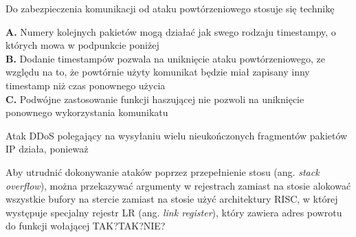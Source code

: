 \begin{solutions}
    \sol Do zabezpieczenia komunikacji od ataku powtórzeniowego stosuje się technikę

    \textbf{A.} Numery kolejnych pakietów mogą działać jak swego rodzaju timestampy, o których mowa w podpunkcie poniżej \\
    \textbf{B.} Dodanie timestampów pozwala na uniknięcie ataku powtórzeniowego, ze względu na to, że powtórnie użyty komunikat będzie miał zapisany inny timestamp niż czas ponownego użycia \\
    \textbf{C.} Podwójne zastosowanie funkcji haszującej nie pozwoli na uniknięcie ponownego wykorzystania komunikatu

    \sol Atak DDoS polegający na wysyłaniu wielu nieukończonych fragmentów pakietów IP działa, ponieważ
    
    \sol Aby utrudnić dokonywanie ataków poprzez przepełnienie stosu (ang. \textit{stack overflow}), można
    \answerss
    {przekazywać argumenty w rejestrach zamiast na stosie}
    {alokować wszystkie bufory na stercie zamiast na stosie}
    {użyć architektury RISC, w której występuje specjalny rejestr LR (ang. \textit{link register}), który zawiera adres powrotu do funkcji wołającej}
    {TAK?}{TAK?}{NIE?}

\end{solutions}
